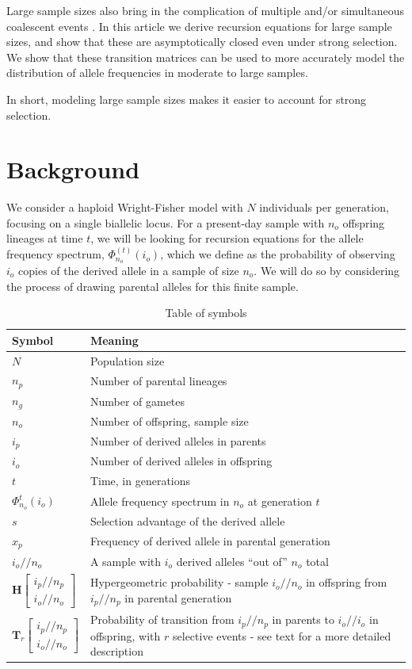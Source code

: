 \documentclass[review]{elsarticle}
\newcommand{\afs}[2]{\Phi_{#1}^{(#2)}}
\newcommand{\dslash}{/\!\!/}
\newcommand{\Coalc}[4]{\begin{bmatrix}#1\dslash #2 \\ #3\dslash #4 \end{bmatrix}}
\begin{document}
Large sample sizes also bring in the complication of multiple and/or simultaneous coalescent events
\citep{BhaskarEtAl2014}. In this article we derive recursion equations for large sample sizes, and
show that these are asymptotically closed even under strong selection. We show that these transition
matrices can be used to more accurately model the distribution of allele frequencies in moderate to
large samples.

In short, modeling large sample sizes makes it easier to account for strong selection. 

\section{Background}
\label{sec:background}

We consider a haploid Wright-Fisher model with $N$ individuals per generation, focusing on a single
biallelic locus. For a present-day sample with $n_o$ offspring lineages at time $t$, we will be
looking for recursion equations for the allele frequency spectrum, $\afs{n_o}{t}(i_o)$, which we
define as the probability of observing $i_o$ copies of the derived allele in a sample of size $n_o$.
We will do so by considering the process of drawing parental alleles for this finite sample.

\begin{table}
  \centering
  \begin{tabular}{l|p{100mm}}
    Symbol & Meaning\\
    \hline
    $N$ & Population size\\
    $n_p$ & Number of parental lineages\\
    $n_g$ & Number of gametes\\
    $n_o$ & Number of offspring, sample size\\
    $i_p$ & Number of derived alleles in parents\\
    $i_o$ & Number of derived alleles in offspring\\
    $t$ & Time, in generations\\
    $\Phi_{n_o}^{t}(i_o)$ & Allele frequency spectrum in $n_o$ at generation $t$\\
    $s$ & Selection advantage of the derived allele\\
    $x_p$ & Frequency of derived allele in parental generation\\
    $i_o \dslash n_o$ & A sample with $i_o$ derived alleles ``out of'' $n_o$ total\\
    $\mathbf{H}\Coalc{i_p}{n_p}{i_o}{n_o}$ & Hypergeometric probability -
                                             sample $i_o \dslash n_o$ in offspring from $i_p \dslash n_p$ in parental generation\\
    $\mathbf{T}_{r}\Coalc{i_p}{n_p}{i_o}{n_o}$ & Probability of transition from $i_p \dslash n_p$ in parents
                                                 to $i_o \dslash i_o$ in offspring, with $r$ selective events -
                                                 see text for a more detailed description\\
  \end{tabular}
  \caption{\label{tab:symbols} Table of symbols}
\end{table}
\end{document}
